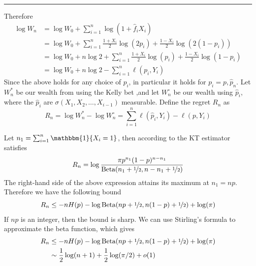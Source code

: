 \documentclass[letterpaper]{article}
\numberwithin{equation}{section}
\theoremstyle{plain}
\begin{document}
\rule{\textwidth}{2pt}
Therefore
\begin{align}
\log W_n &= \log W_0 + \sum_{i=1}^n \log(1+\hat{f}_i X_i)\\
&= \log W_0 + \sum_{i=1}^n \frac{1+X_i}{2} \log(2 p_i) + \frac{1-X_i}{2}\log(2(1-p_i))\\
&= \log W_0 + n\log 2 + \sum_{i=1}^n \frac{1+X_i}{2}\log(p_i) + \frac{1-X_i}{2}\log(1-p_i)\\
&= \log W_0 + n\log 2 - \sum_{i=1}^n \ell(p_i,Y_i)
\end{align}
Since the above holds for any choice of $p_i$, in particular it holds for $p_i=p,\hat{p}_n$. Let $W_n^*$ be our wealth from using the Kelly bet ,and let $W_n^\circ$ be our wealth using $\hat{p}_i$, where the $\hat{p}_i$ are $\sigma(X_1,X_2,\ldots,X_{i-1})$ measurable. Define the regret $R_n$ as
\begin{equation}
R_n = \log W_n^* - \log W_n^\circ = \sum_{i=1}^n \ell(\hat{p}_i,Y_i) - \ell(p,Y_i)
\end{equation}

Let $n_1 = \sum_{i=1}^n \mathbbm{1}\{X_i=1\}$, then according to \cite{cesa2006prediction} the KT estimator satisfies
\begin{equation}
R_n = \log\frac{\pi p^{n_1}(1-p)^{n-n_1}}{\text{Beta}(n_1+\nicefrac{1}{2}, n-n_1 + \nicefrac{1}{2})}
\end{equation}
The right-hand side of the above expression attains its maximum at $n_1 = np$. Therefore we have the following bound
\begin{equation}
R_n \le -nH(p) -\log \text{Beta}(np+\nicefrac{1}{2}, n(1-p)+\nicefrac{1}{2}) + \log(\pi)
\end{equation}
If $np$ is an integer, then the bound is sharp. We can use Stirling's formula to approximate the beta function, which gives
\begin{align}\label{kt_regret_bound}
R_n &\le -nH(p) -\log \text{Beta}(np+\nicefrac{1}{2}, n(1-p)+\nicefrac{1}{2}) + \log(\pi)\\
&\sim \frac{1}{2}\log(n+1) + \frac{1}{2}\log(\pi/2) + o(1)\label{asymp_regret_bound}
\end{align}
\end{document}
